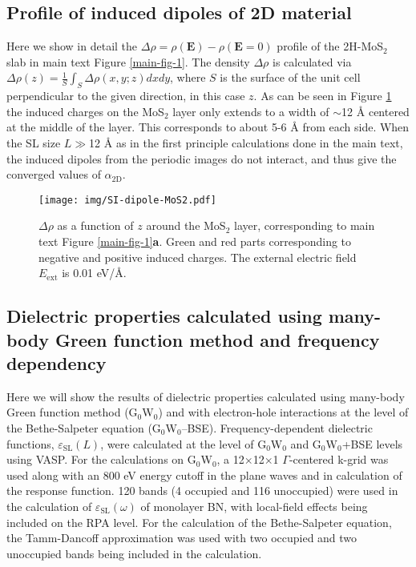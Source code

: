 \documentclass[manuscript=suppinfo,email=true,hyperref=true,keywords=false]{achemso}
\begin{document}
\subsection{Profile of induced dipoles of 2D material}
\label{sec:dipole-plot}
Here we show in detail the
$\Delta {\rho}=\rho(\boldsymbol{E}) - \rho(\boldsymbol{E}=0)$ profile of
the 2H-MoS$_{2}$ slab in main text Figure \ref{main-fig-1}. The
density $\Delta \rho$ is calculated via $\Delta \rho(z) = \frac{1}{S} \int_{S} \Delta \rho (x,y;z) dx dy $, 
where $S$ is the surface of the unit cell perpendicular to the given direction, in this case $z$. 
%
As can be seen in Figure \ref{fig:rho-profile} the induced charges on
the MoS$_{2}$ layer only extends to a width of $\sim{}$12 \AA{}
centered at the middle of the layer. This corresponds to about 5-6 \AA
from each side.  When the SL size $L \gg$12 \AA{} as in the first
principle calculations done in the main text, the induced dipoles from
the periodic images do not interact, and thus give the converged
values of $\alpha_{\mathrm{2D}}$.

\begin{figure}[htbp]
 \centering
 \texttt{[image: img/SI-dipole-MoS2.pdf]}
 \caption{$\Delta \rho$ as a function of $z$ around the
   MoS$_{2}$ layer, corresponding to main text Figure
   \ref{main-fig-1}\textbf{a}. Green and red parts corresponding to negative and
   positive induced charges. The external electric field
   $E_{\mathrm{ext}}$ is 0.01 eV/\AA{}.}
 \label{fig:rho-profile}
\end{figure}

\subsection{Dielectric properties calculated using many-body Green function method and frequency dependency}
\label{ssec:gw}

Here we will show the results of dielectric properties calculated
using many-body Green function method (G$_{0}$W$_{0}$) and with
electron-hole interactions at the level of the Bethe-Salpeter equation
(G$_{0}$W$_{0}$–BSE). Frequency-dependent dielectric functions,
$\varepsilon_{\mathrm{SL}}(L)$, were calculated at the level of
G$_{0}$W$_{0}$ and G$_{0}$W$_{0}$+BSE levels using VASP. For the
calculations on G$_{0}$W$_{0}$, a 12$\times$12$\times$1 $\Gamma$-centered k-grid was
used along with an 800 eV energy cutoff in the plane waves and in
calculation of the response function. 120 bands (4 occupied and 116
unoccupied) were used in the calculation of
$\varepsilon_{\mathrm{SL}}(\omega)$ of monolayer BN, with local-field
effects being included on the RPA level. For the calculation of the
Bethe-Salpeter equation, the Tamm-Dancoff approximation was used with
two occupied and two unoccupied bands being included in the
calculation.
\end{document}

